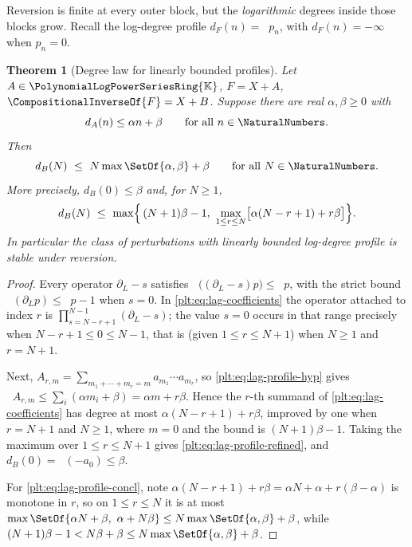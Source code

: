 \documentclass[11pt,oneside]{article}
\theoremstyle{plain}
\newtheorem{theorem}{Theorem}[section]
\theoremstyle{definition}
\theoremstyle{remark}
\newcommand{\K}{\mathbb{K}}
\newcommand{\PLpow}{\PolynomialLogPowerSeriesRing{\K}}   %
\DeclareMathOperator{\degL}{deg_{L}}
\newcommand{\rev}[1]{\CompositionalInverseOf{#1}}
\newcommand{\dprofile}[1]{d_{#1}}                        %
\begin{document}
Reversion is finite at every outer block, but the \emph{logarithmic} degrees
inside those blocks grow.  Recall the log-degree profile
\(\dprofile{F}(n)=\degL p_n\), with \(\dprofile{F}(n)=-\infty\) when
\(p_n=0\).

\begin{theorem}[Degree law for linearly bounded profiles]
\label{plt:thm:lag-degree-bound}
Let \(A\in\PLpow\), \(F=X+A\), \(\rev{F}=X+B\).  Suppose there are real
\(\alpha,\beta\ge0\) with
\begin{equation}
\label{plt:eq:lag-profile-hyp}
  \dprofile{A}(n)\le\alpha n+\beta
  \qquad\text{for all }n\in\NaturalNumbers .
\end{equation}
Then
\begin{equation}
\label{plt:eq:lag-profile-concl}
  \dprofile{B}(N)\ \le\ N\max\SetOf{\alpha,\beta}+\beta
  \qquad\text{for all }N\in\NaturalNumbers .
\end{equation}
More precisely, \(\dprofile{B}(0)\le\beta\) and, for \(N\ge1\),
\begin{equation}
\label{plt:eq:lag-profile-refined}
  \dprofile{B}(N)\ \le\
  \max\Bigl\{\,(N+1)\beta-1,\
    \max_{1\le r\le N}\bigl[\alpha(N-r+1)+r\beta\bigr]\Bigr\}.
\end{equation}
In particular the class of perturbations with linearly bounded log-degree
profile is stable under reversion.
\end{theorem}

\begin{proof}
Every operator \(\partial_L-s\) satisfies \(\degL\bigl((\partial_L-s)p\bigr)\le\degL p\),
with the strict bound \(\degL(\partial_Lp)\le\degL p-1\) when \(s=0\).  In
\cref{plt:eq:lag-coefficients} the operator attached to index \(r\) is
\(\prod_{s=N-r+1}^{N-1}(\partial_L-s)\); the value \(s=0\) occurs in that range
precisely when \(N-r+1\le0\le N-1\), that is (given \(1\le r\le N+1\)) when
\(N\ge1\) and \(r=N+1\).

Next, \(A_{r,m}=\sum_{m_1+\cdots+m_r=m}a_{m_1}\cdots a_{m_r}\), so
\cref{plt:eq:lag-profile-hyp} gives
\(\degL A_{r,m}\le\sum_i(\alpha m_i+\beta)=\alpha m+r\beta\).  Hence the
\(r\)-th summand of \cref{plt:eq:lag-coefficients} has degree at most
\(\alpha(N-r+1)+r\beta\), improved by one when \(r=N+1\) and \(N\ge1\), where
\(m=0\) and the bound is \((N+1)\beta-1\).  Taking the maximum over
\(1\le r\le N+1\) gives \cref{plt:eq:lag-profile-refined}, and
\(\dprofile{B}(0)=\degL(-a_0)\le\beta\).

For \cref{plt:eq:lag-profile-concl}, note
\(\alpha(N-r+1)+r\beta=\alpha N+\alpha+r(\beta-\alpha)\) is monotone in \(r\),
so on \(1\le r\le N\) it is at most
\(\max\SetOf{\alpha N+\beta,\ \alpha+N\beta}\le N\max\SetOf{\alpha,\beta}+\beta\),
while \((N+1)\beta-1<N\beta+\beta\le N\max\SetOf{\alpha,\beta}+\beta\).
\end{proof}
\end{document}
